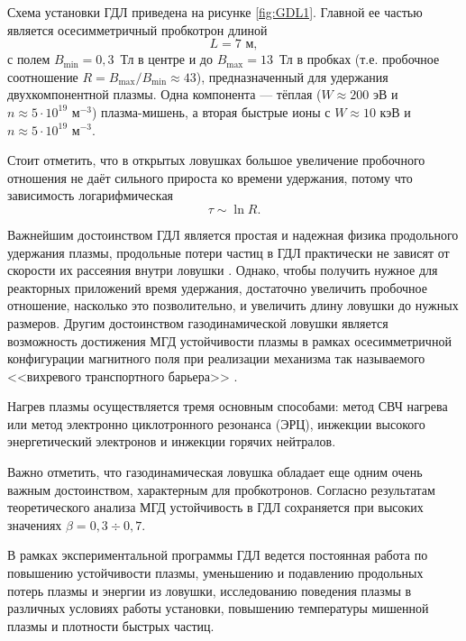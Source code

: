 Схема установки ГДЛ приведена на рисунке \ref{fig:GDL1}. Главной ее частью является осесимметричный пробкотрон длиной
\[
L = 7 \text{ м},
\] 
с полем $B_{\min} = 0,3$~Тл в центре и до $B_{\max} = 13$~Тл в пробках (т.е. пробочное соотношение $R = B_{\max}/B_{\min} \approx 43$), предназначенный для удержания двухкомпонентной плазмы. Одна компонента --- тёплая ($W \approx 200 \text{ эВ}$ и $n \approx 5 \cdot 10^{19} \text{ м}^{-3}$) плазма-мишень, а вторая быстрые ионы с $W \approx 10 \text{ кэВ}$ и $n \approx 5 \cdot 10^{19} \text{ м}^{-3}$. 

Стоит отметить, что в открытых ловушках большое увеличение пробочного отношения не даёт сильного прироста ко времени удержания, потому что \cite{dimov2005} зависимость логарифмическая
\[
\tau \sim \ln R.
\]

Важнейшим достоинством ГДЛ является простая и надежная физика продольного удержания плазмы, продольные потери частиц в ГДЛ практически не зависят от скорости их рассеяния внутри ловушки \cite{gdl_review}. Однако, чтобы получить нужное для реакторных приложений время удержания, достаточно увеличить пробочное отношение, насколько это позволительно, и увеличить длину ловушки до нужных размеров. Другим достоинством газодинамической ловушки является возможность достижения МГД устойчивости плазмы в рамках осесимметричной конфигурации магнитного поля при реализации механизма так называемого <<вихревого транспортного барьера>> \cite{beklemishev2010vortex}.

Нагрев плазмы осуществляется тремя основным способами: метод СВЧ нагрева или метод электронно циклотронного резонанса (ЭРЦ), инжекции высокого энергетический электронов и инжекции горячих нейтралов.

Важно отметить, что газодинамическая ловушка обладает еще одним очень важным достоинством, характерным для пробкотронов. Согласно результатам теоретического анализа МГД устойчивость в ГДЛ сохраняется при высоких значениях $\beta = 0,3 \div 0,7$.

В рамках экспериментальной программы ГДЛ ведется постоянная работа по повышению устойчивости плазмы, уменьшению и подавлению продольных потерь плазмы и энергии из ловушки, исследованию поведения плазмы в различных условиях работы установки, повышению температуры мишенной плазмы и плотности быстрых частиц.


